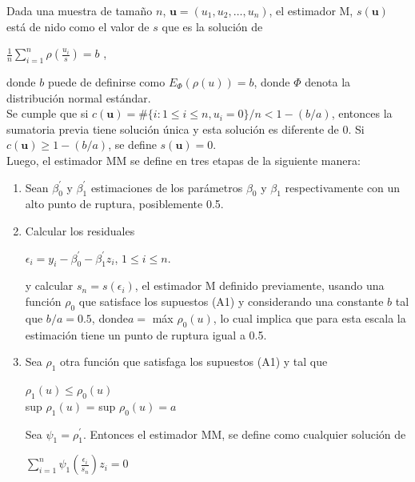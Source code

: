 Dada una muestra de tamaño $n$, $ \mathbf{u} = (u_{1}, u_{2}, \dots , u_{n})$,  el estimador M, $s(\mathbf{u})$ está de nido como el valor de $s$ que es la solución de\\

\begin{center}
	{\Large	$\frac{1}{n} \sum_{i=1}^{n} \rho( \frac{u_{i}}{s}) = b$ },\\
\end{center}

donde $b$ puede de definirse como $E_{\Phi}(\rho(u)) = b$, donde $\Phi$ denota la distribución normal estándar.\\

Se cumple que si $c(\mathbf{u}) = \#\{i : 1 \leq i \leq n, u_{i}=0\} / n < 1- (b/a) $, entonces la sumatoria previa tiene solución única y esta solución es diferente de 0. Si $c(\mathbf{u}) \geq 1 -  (b/a)$, se define $s(\mathbf{u}) = 0$. \\

Luego, el estimador MM se define en tres etapas de la siguiente manera:\\

\begin{enumerate}
	\item Sean $ \beta_{0}^{'}$ y $ \beta_{1}^{'}$ estimaciones de los parámetros $\beta_{0}$ y $ \beta_{1}$ respectivamente con un alto punto de ruptura, posiblemente 0.5.
	\item  Calcular los residuales\\
	\begin{center}
		 $ \epsilon_{i} = y_{i} -\beta_{0}^{'} -\beta_{1}^{'} z_{i}  $, $1 \leq i \leq n $.\\
	\end{center}
	
	y calcular $s_{n} = s(\epsilon_{i})$, el estimador M definido previamente, usando una función $\rho_{0}$ que satisface los supuestos (A1) y considerando una constante $b$ tal que $b/a = 0.5$, donde$ a = $ máx $ \rho_{0}(u)$, lo cual implica que para esta escala la estimación tiene un
	punto de ruptura igual a 0.5.
	
	\item  Sea $\rho_{1}$ otra función que satisfaga los supuestos (A1) y tal que\\
	\begin{center}
		$\rho_{1}(u) \leq \rho_{0}(u)$\\
		sup $\rho_{1}(u)$  = sup $ \rho_{0}(u) = a$\\
	\end{center}

	
	Sea $\psi_{1} = \rho_{1}^{'}$. Entonces el estimador MM, se define como cualquier solución de\\
	\begin{center}
	{\large	$\sum_{i=1}^{n} \psi_{1} (\frac{\epsilon_{i}}{s_{n}}) z_{i} = 0$}\\
	\end{center}

\end{enumerate}


